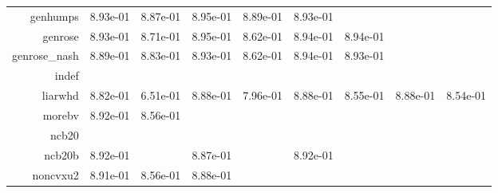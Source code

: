 \begin{tabular}{rrrrrrrrr}
  genhumps &  8.93e-01 &  8.87e-01 &  8.95e-01 &  8.89e-01 &  8.93e-01 & \cellcolor{black}{\color{white}{ 8.87e-01}} & \cellcolor{black}{\color{white}{ 8.72e-01}} & \cellcolor{black}{\color{white}{ 8.86e-01}} \\
  genrose &  8.93e-01 &  8.71e-01 &  8.95e-01 &  8.62e-01 &  8.94e-01 &  8.94e-01 & \cellcolor{black}{\color{white}{ 8.94e-01}} & \cellcolor{black}{\color{white}{ 8.59e-01}} \\
  genrose\_nash &  8.89e-01 &  8.83e-01 &  8.93e-01 &  8.62e-01 &  8.94e-01 &  8.93e-01 & \cellcolor{black}{\color{white}{ 8.94e-01}} & \cellcolor{black}{\color{white}{ 8.61e-01}} \\
  indef & \cellcolor{black}{\color{white}{ 8.91e-01}} & \cellcolor{black}{\color{white}{ 8.61e-01}} & \cellcolor{black}{\color{white}{ 8.92e-01}} & \cellcolor{black}{\color{white}{ 8.57e-01}} & \cellcolor{black}{\color{white}{ 8.86e-01}} & \cellcolor{black}{\color{white}{ 8.56e-01}} & \cellcolor{black}{\color{white}{ 8.86e-01}} & \cellcolor{black}{\color{white}{ 8.68e-01}} \\
  liarwhd &  8.82e-01 &  6.51e-01 &  8.88e-01 &  7.96e-01 &  8.88e-01 &  8.55e-01 &  8.88e-01 &  8.54e-01 \\
  morebv &  8.92e-01 &  8.56e-01 & \cellcolor{black}{\color{white}{ 8.93e-01}} & \cellcolor{black}{\color{white}{ 8.60e-01}} & \cellcolor{black}{\color{white}{ 8.93e-01}} & \cellcolor{black}{\color{white}{ 8.56e-01}} & \cellcolor{black}{\color{white}{ 8.93e-01}} & \cellcolor{black}{\color{white}{ 8.56e-01}} \\
  ncb20 & \cellcolor{black}{\color{white}{ 8.93e-01}} & \cellcolor{black}{\color{white}{ 8.55e-01}} & \cellcolor{black}{\color{white}{ 8.92e-01}} & \cellcolor{black}{\color{white}{ 8.66e-01}} & \cellcolor{black}{\color{white}{ 8.77e-01}} & \cellcolor{black}{\color{white}{ 8.84e-01}} & \cellcolor{black}{\color{white}{ 8.93e-01}} & \cellcolor{black}{\color{white}{ 8.87e-01}} \\
  ncb20b &  8.92e-01 & \cellcolor{black}{\color{white}{ 8.58e-01}} &  8.87e-01 & \cellcolor{black}{\color{white}{ 8.56e-01}} &  8.92e-01 & \cellcolor{black}{\color{white}{ 8.60e-01}} & \cellcolor{black}{\color{white}{ 8.82e-01}} & \cellcolor{black}{\color{white}{ 8.76e-01}} \\
  noncvxu2 &  8.91e-01 &  8.56e-01 &  8.88e-01 & \cellcolor{black}{\color{white}{ 8.59e-01}} & \cellcolor{black}{\color{white}{ 8.93e-01}} & \cellcolor{black}{\color{white}{ 8.63e-01}} & \cellcolor{black}{\color{white}{ 8.63e-01}} & \cellcolor{black}{\color{white}{ 7.44e-01}} \\

\end{tabular}
